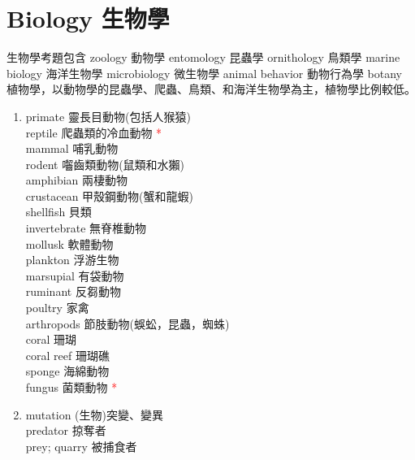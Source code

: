 \documentclass[twoside,b5paper]{book}
\begin{document}
  \chapter{Biology 生物學}
  生物學考題包含 zoology 動物學 entomology 昆蟲學 ornithology 鳥類學 marine biology 海洋生物學 microbiology 微生物學 animal
  behavior 動物行為學 botany 植物學，以動物學的昆蟲學、爬蟲、鳥類、和海洋生物學為主，植物學比例較低。

  \begin{enumerate}
    \item
      primate  靈長目動物(包括人猴猿)\\
      reptile  爬蟲類的冷血動物 \textcolor{red}{*}\\
      mammal  哺乳動物\\
      rodent  囓齒類動物(鼠類和水獺)\\
      amphibian  兩棲動物\\
      crustacean  甲殼鋼動物(蟹和龍蝦)\\
      shellfish 貝類\\
      invertebrate 無脊椎動物\\
      mollusk  軟體動物\\
      plankton  浮游生物\\
      marsupial  有袋動物\\
      ruminant  反芻動物\\
      poultry  家禽\\
      arthropods  節肢動物(蜈蚣，昆蟲，蜘蛛)\\
      coral 珊瑚\\
      coral reef 珊瑚礁\\
      sponge 海綿動物\\
      fungus  菌類動物 \textcolor{red}{*}
    \item
      mutation (生物)突變、變異\\
      predator  掠奪者\\
      prey; quarry  被捕食者\\

\end{enumerate}
\end{document}
